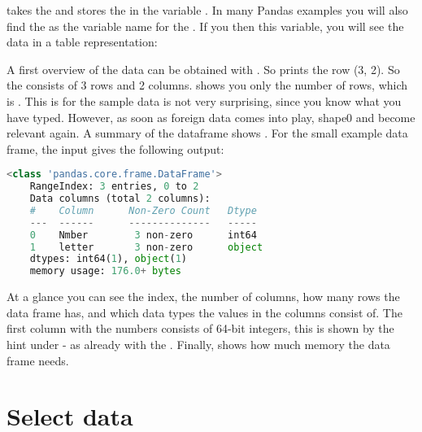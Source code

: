  takes the  and stores the  in the variable . In many Pandas examples you will also find the  as the variable name for the . If you then  this variable, you will see the data in a table representation:
\medskip





\medskip

A first overview of the data can be obtained with . So  prints the row \PYTHON(3, 2). So the  consists of 3 rows and 2 columns.  shows you only the number of rows, which is . This is for the sample data is not very surprising, since you know what you have typed. However, as soon as foreign data comes into play, shape0 and  become relevant again.
A summary of the dataframe shows . For the small example data frame, the input  gives the following output:

\medskip

\begin{lstlisting}[language=Python]
	<class 'pandas.core.frame.DataFrame'>
	RangeIndex: 3 entries, 0 to 2
	Data columns (total 2 columns):
	#    Column      Non-Zero Count   Dtype
	---  ------      --------------   -----
	0    Nmber        3 non-zero      int64
	1    letter       3 non-zero      object
	dtypes: int64(1), object(1)
	memory usage: 176.0+ bytes
\end{lstlisting}
\medskip

At a glance you can see the index, the number of columns, how many rows the data frame has, and which data types the values in the columns consist of. The first column with the numbers consists of 64-bit integers, this is shown by the hint  under  - as already with the . Finally,  shows how much memory the data frame needs.


\section{Select data}

